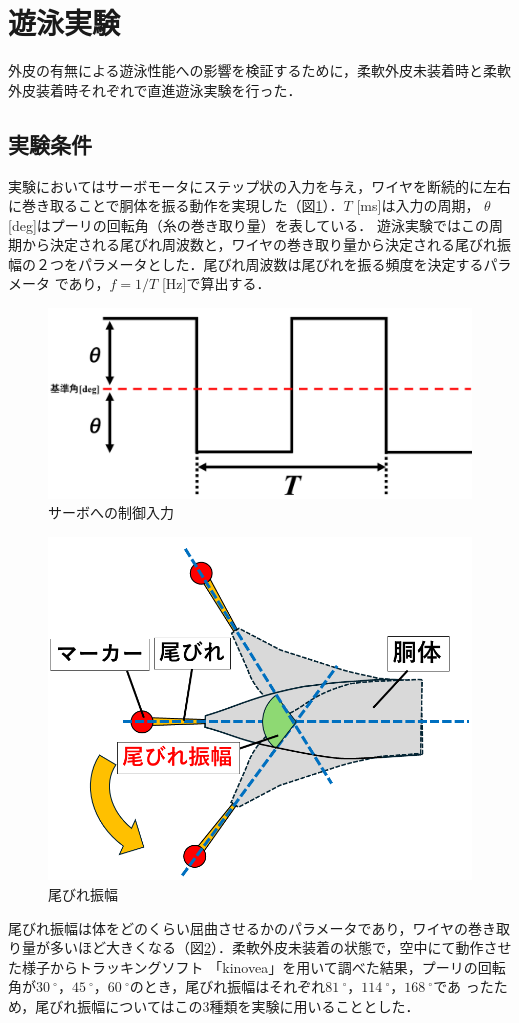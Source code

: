 \newpage
\section{遊泳実験}
外皮の有無による遊泳性能への影響を検証するために，柔軟外皮未装着時と柔軟外皮装着時それぞれで直進遊泳実験を行った．

\subsection{実験条件}
実験においてはサーボモータにステップ状の入力を与え，ワイヤを断続的に左右に巻き取ることで胴体を振る動作を実現した（図\ref{fig:servo_seigyo}）．$T$ [ms]は入力の周期，
$\theta$ [deg]はプーリの回転角（糸の巻き取り量）を表している．
遊泳実験ではこの周期から決定される尾びれ周波数と，ワイヤの巻き取り量から決定される尾びれ振幅の２つをパラメータとした．尾びれ周波数は尾びれを振る頻度を決定するパラメータ
であり，$f = 1/T$ [Hz]で算出する．
\begin{figure}[hb]
    \centering
    \includegraphics[width=0.75\linewidth]{chapters/picture/servo2.png}
    \caption{サーボへの制御入力}
    \label{fig:servo_seigyo}
\end{figure}
\begin{figure}[hb]
    \centering
    \includegraphics[width=0.6\linewidth]{chapters/picture/obire_amp.png}
    \caption{尾びれ振幅}
    \label{fig:obire_amp}
\end{figure}
尾びれ振幅は体をどのくらい屈曲させるかのパラメータであり，ワイヤの巻き取り量が多いほど大きくなる（図\ref{fig:obire_amp}）．柔軟外皮未装着の状態で，空中にて動作させた様子からトラッキングソフト
「kinovea」を用いて調べた結果，プーリの回転角が$30\:^\circ$，$45\:^\circ$，$60\:^\circ$のとき，尾びれ振幅はそれぞれ$81\:^\circ$，$114\:^\circ$，$168\:^\circ$であ
ったため，尾びれ振幅についてはこの3種類を実験に用いることとした． 


